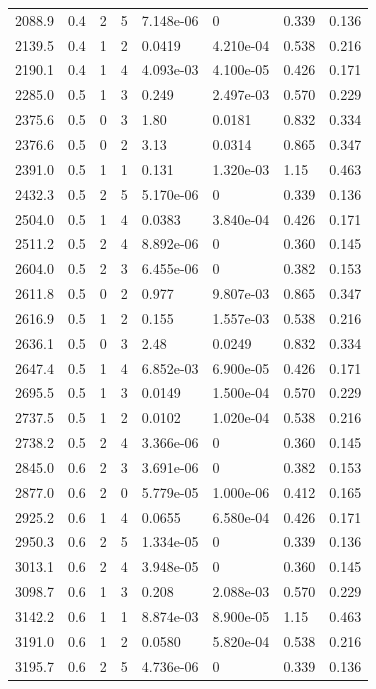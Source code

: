\documentclass[preview]{standalone}
\begin{document}
{{{\begin{tabular}{L{1.2cm}C{1.2cm} C{0.3cm}C{0.5cm} C{1.4cm}C{1.4cm} C{1.4cm}C{1.4cm}}
  2088.9  &   0.4  & 2     &  5 &  7.148e-06  & 0  & 0.339 &  0.136   \\ 
  2139.5  &   0.4  & 1     &  2 &  0.0419  & 4.210e-04  & 0.538 &  0.216   \\ 
  2190.1  &   0.4  & 1     &  4 &  4.093e-03  & 4.100e-05  & 0.426 &  0.171   \\ 
  2285.0  &   0.5  & 1     &  3 &  0.249  & 2.497e-03  & 0.570 &  0.229   \\ 
  2375.6  &   0.5  & 0     &  3 &  1.80  & 0.0181  & 0.832 &  0.334   \\ 
  2376.6  &   0.5  & 0     &  2 &  3.13  & 0.0314  & 0.865 &  0.347   \\ 
  2391.0  &   0.5  & 1     &  1 &  0.131  & 1.320e-03  & 1.15 &  0.463   \\ 
  2432.3  &   0.5  & 2     &  5 &  5.170e-06  & 0  & 0.339 &  0.136   \\ 
  2504.0  &   0.5  & 1     &  4 &  0.0383  & 3.840e-04  & 0.426 &  0.171   \\ 
  2511.2  &   0.5  & 2     &  4 &  8.892e-06  & 0  & 0.360 &  0.145   \\ 
  2604.0  &   0.5  & 2     &  3 &  6.455e-06  & 0  & 0.382 &  0.153   \\ 
  2611.8  &   0.5  & 0     &  2 &  0.977  & 9.807e-03  & 0.865 &  0.347   \\ 
  2616.9  &   0.5  & 1     &  2 &  0.155  & 1.557e-03  & 0.538 &  0.216   \\ 
  2636.1  &   0.5  & 0     &  3 &  2.48  & 0.0249  & 0.832 &  0.334   \\ 
  2647.4  &   0.5  & 1     &  4 &  6.852e-03  & 6.900e-05  & 0.426 &  0.171   \\ 
  2695.5  &   0.5  & 1     &  3 &  0.0149  & 1.500e-04  & 0.570 &  0.229   \\ 
  2737.5  &   0.5  & 1     &  2 &  0.0102  & 1.020e-04  & 0.538 &  0.216   \\ 
  2738.2  &   0.5  & 2     &  4 &  3.366e-06  & 0  & 0.360 &  0.145   \\ 
  2845.0  &   0.6  & 2     &  3 &  3.691e-06  & 0  & 0.382 &  0.153   \\ 
  2877.0  &   0.6  & 2     &  0 &  5.779e-05  & 1.000e-06  & 0.412 &  0.165   \\ 
  2925.2  &   0.6  & 1     &  4 &  0.0655  & 6.580e-04  & 0.426 &  0.171   \\ 
  2950.3  &   0.6  & 2     &  5 &  1.334e-05  & 0  & 0.339 &  0.136   \\ 
  3013.1  &   0.6  & 2     &  4 &  3.948e-05  & 0  & 0.360 &  0.145   \\ 
  3098.7  &   0.6  & 1     &  3 &  0.208  & 2.088e-03  & 0.570 &  0.229   \\ 
  3142.2  &   0.6  & 1     &  1 &  8.874e-03  & 8.900e-05  & 1.15 &  0.463   \\ 
  3191.0  &   0.6  & 1     &  2 &  0.0580  & 5.820e-04  & 0.538 &  0.216   \\ 
  3195.7  &   0.6  & 2     &  5 &  4.736e-06  & 0  & 0.339 &  0.136   \\ 
\hline 
\end{tabular} 

}}}
\end{document}
